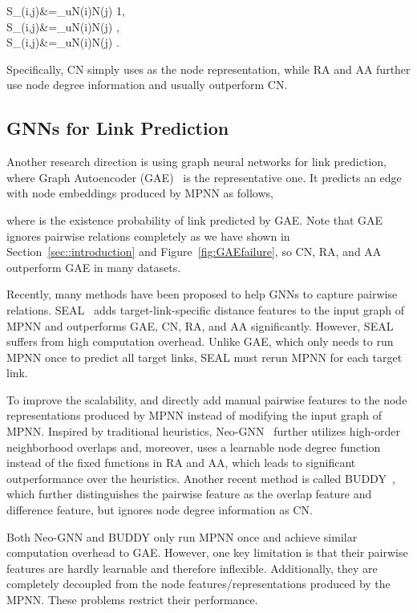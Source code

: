 \documentclass{article}
\theoremstyle{plain}
\theoremstyle{definition}
\theoremstyle{remark}
\begin{document}
    S_{}(i,j)&=\sum_{u\in N(i)\bigcap N(j)} 1,\\
    S_{}(i,j)&=\sum_{u\in N(i)\bigcap N(j)} ,\\
    S_{}(i,j)&=\sum_{u\in N(i)\bigcap N(j)} .

Specifically, CN simply uses  as the node representation, while RA and AA further use node degree information and usually outperform CN.

\subsection{GNNs for Link Prediction}\label{sec:relatedwork:LPmodel}
Another research direction is using graph neural networks for link prediction, where 
Graph Autoencoder (GAE)~\citep{GAE} is the representative one. It predicts an edge with node embeddings produced by MPNN as follows,

where  is the existence probability of link  predicted by GAE. Note that GAE ignores pairwise relations completely as we have shown in Section~\ref{sec::introduction} and Figure~\ref{fig:GAEfailure}, so CN, RA, and AA outperform GAE in many datasets.

Recently, many methods have been proposed to help GNNs to capture pairwise relations. SEAL~\citep{SEAL} adds target-link-specific distance features to the input graph of MPNN and outperforms GAE, CN, RA, and AA significantly. However, SEAL suffers from high computation overhead. Unlike GAE, which only needs to run MPNN once to predict all target links, SEAL must rerun MPNN for each target link. 

To improve the scalability, \citet{Neo-GNN} and \citet{Gsketch} directly add manual pairwise features to the node representations produced by MPNN instead of modifying the input graph of MPNN. 
Inspired by traditional heuristics, Neo-GNN~\citep{Neo-GNN} further utilizes high-order neighborhood overlaps and, moreover, uses a learnable node degree function instead of the fixed functions in RA and AA, which leads to significant outperformance over the heuristics. Another recent method is called BUDDY~\citep{Gsketch}, 
which further distinguishes the pairwise feature as the overlap feature and difference feature, but ignores node degree information as CN.

Both Neo-GNN and BUDDY only run MPNN once and achieve similar computation overhead to GAE. However, one key limitation is that their pairwise features are hardly learnable and therefore inflexible. Additionally, they are completely decoupled from the node features/representations produced by the MPNN. These problems restrict their performance.
\end{document}
